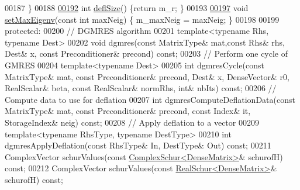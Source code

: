 \begin{DoxyCode}
00187   \}
00188   
\hyperlink{class_eigen_1_1_d_g_m_r_e_s_a724f0f2f124376c3694fd69c59a88d5a}{00192}   \textcolor{keywordtype}{int} \hyperlink{class_eigen_1_1_d_g_m_r_e_s_a724f0f2f124376c3694fd69c59a88d5a}{deflSize}() \{\textcolor{keywordflow}{return} m\_r; \}
00193   
\hyperlink{class_eigen_1_1_d_g_m_r_e_s_ada9f5fbba382ae941f207322a8b84a01}{00197}   \textcolor{keywordtype}{void} \hyperlink{class_eigen_1_1_d_g_m_r_e_s_ada9f5fbba382ae941f207322a8b84a01}{setMaxEigenv}(\textcolor{keyword}{const} \textcolor{keywordtype}{int} maxNeig) \{ m\_maxNeig = maxNeig; \}
00198   
00199   \textcolor{keyword}{protected}:
00200     \textcolor{comment}{// DGMRES algorithm }
00201     \textcolor{keyword}{template}<\textcolor{keyword}{typename} Rhs, \textcolor{keyword}{typename} Dest>
00202     \textcolor{keywordtype}{void} dgmres(\textcolor{keyword}{const} MatrixType& mat,\textcolor{keyword}{const} Rhs& rhs, Dest& x, \textcolor{keyword}{const} Preconditioner& precond) \textcolor{keyword}{const};
00203     \textcolor{comment}{// Perform one cycle of GMRES}
00204     \textcolor{keyword}{template}<\textcolor{keyword}{typename} Dest>
00205     \textcolor{keywordtype}{int} dgmresCycle(\textcolor{keyword}{const} MatrixType& mat, \textcolor{keyword}{const} Preconditioner& precond, Dest& x, DenseVector& r0, 
      RealScalar& beta, \textcolor{keyword}{const} RealScalar& normRhs, \textcolor{keywordtype}{int}& nbIts) \textcolor{keyword}{const}; 
00206     \textcolor{comment}{// Compute data to use for deflation }
00207     \textcolor{keywordtype}{int} dgmresComputeDeflationData(\textcolor{keyword}{const} MatrixType& mat, \textcolor{keyword}{const} Preconditioner& precond, \textcolor{keyword}{const} Index& it, 
      StorageIndex& neig) \textcolor{keyword}{const};
00208     \textcolor{comment}{// Apply deflation to a vector}
00209     \textcolor{keyword}{template}<\textcolor{keyword}{typename} RhsType, \textcolor{keyword}{typename} DestType>
00210     \textcolor{keywordtype}{int} dgmresApplyDeflation(\textcolor{keyword}{const} RhsType& In, DestType& Out) \textcolor{keyword}{const}; 
00211     ComplexVector schurValues(\textcolor{keyword}{const} \hyperlink{group___eigenvalues___module_class_eigen_1_1_complex_schur}{ComplexSchur<DenseMatrix>}& schurofH) \textcolor{keyword}{const};
00212     ComplexVector schurValues(\textcolor{keyword}{const} \hyperlink{group___eigenvalues___module_class_eigen_1_1_real_schur}{RealSchur<DenseMatrix>}& schurofH) \textcolor{keyword}{const};

\end{DoxyCode}
